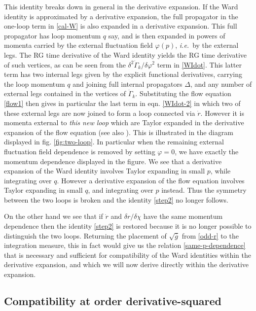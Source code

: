 \documentclass[11pt,draft]{book} %
\newcommand\ie{\textit{i.e.}\ }
\begin{document}
This identity breaks down in general in the derivative expansion.
If the Ward identity is approximated by a derivative expansion,
the full propagator in the one-loop term in \eqref{cal-W} is also expanded in a derivative expansion.
This full propagator has loop momentum $q$ say,
and is then expanded in powers of momenta carried by the external fluctuation
field $\varphi(p)$, \ie by the external legs.
The RG time derivative of the Ward identity yields the RG time derivative of such vertices,
as can be seen from the $\delta^2\dot{\Gamma}_k/\delta\varphi^2$ term  in \eqref{WIdot}.
This latter term has two internal legs given by the explicit functional derivatives,
carrying the loop momentum $q$ and joining full internal propagators $\Delta$,
and any number of external legs contained in the vertices of $\dot{\Gamma}_k$.
Substituting the flow equation \eqref{flow1} then gives in particular the last term in
eqn. \eqref{WIdot-2} in which two of these external legs are now joined to form a loop
connected via $\dot{r}$.  However it is momenta external to \emph{this new loop} which are
Taylor expanded in the derivative expansion of the flow equation
(see also \cite{Morris:1999ba, Morris:2000hm}).
This is illustrated in the diagram displayed in fig. \ref{fig:two-loop}.
In particular when the remaining external fluctuation field dependence is removed by setting $\varphi=0$,
we have exactly the momentum dependence displayed in the figure.
We see that a derivative expansion of the Ward identity involves Taylor expanding in small $p$,
while integrating over $q$.
However a derivative expansion of the flow equation involves Taylor expanding in small $q$,
and integrating over $p$ instead.
Thus the symmetry between the two loops is broken and the identity \eqref{step2} no longer follows.

On the other hand we see that if $\dot{r}$ and $\delta r/\delta\chi$ have the same momentum
dependence then the identity \eqref{step2} is restored because it is no longer possible
to distinguish the two loops.
Returning the placement of $\sqrt{\bar{g}}$ from \eqref{odd-r} to the integration measure,
this in fact would give us the relation \eqref{same-p-dependence} that is necessary and
sufficient for compatibility of the Ward identities within the derivative expansion,
and which we will now derive directly within the derivative expansion.


\subsection{Compatibility at order derivative-squared}\label{sec:compatibility-at-d2}
\end{document}
